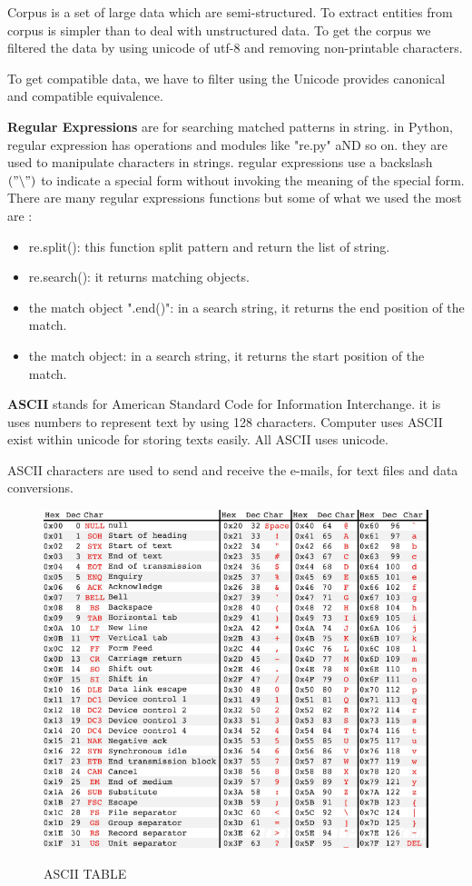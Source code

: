 \begin{itemize}
Corpus is a set of large data which are semi-structured.  To extract entities from corpus is simpler than to deal with unstructured data. To get the corpus we filtered the data by using unicode of utf-8 and removing non-printable characters.

To get compatible data, we have to filter using the Unicode provides canonical and compatible equivalence.


\textbf{Regular Expressions} are for searching matched patterns in string.  
in Python, regular expression has operations and modules like "re.py" aND so on. they are used to manipulate characters in strings. regular expressions use a backslash $(" \backslash  ")$  to indicate a special form without invoking the meaning of the special form. There are many regular expressions functions but some of what we used the most are :
\begin{itemize}
\item re.split(): this function split pattern and return the list of string.
\item re.search(): it returns matching  objects.
\item the match object ".end()": in a search string, it returns the end position of the match.
\item the match object: in a search string, it returns the start position of the match.
\end{itemize}

\textbf{ASCII} stands for American Standard Code for Information Interchange. it is uses numbers to represent text by using 128 characters. Computer uses ASCII exist within unicode for storing texts easily. All  ASCII uses unicode.

ASCII characters are used to send and receive the e-mails, for text files and data conversions. 

\begin{figure}[hbtp]
\caption{ASCII TABLE \citep{witte2002electronic}}
\centering
\includegraphics[scale=.6]{images/ASCII.png}\label{ASCII}
\end{figure}
\end{itemize}

